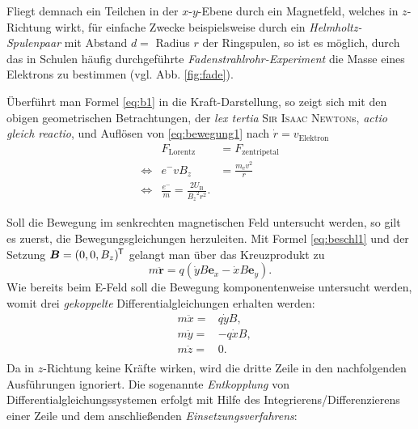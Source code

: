 Fliegt demnach ein Teilchen in der $x$-$y$-Ebene durch ein Magnetfeld, welches in $z$-Richtung wirkt, für einfache Zwecke beispielsweise durch ein \textit{Helmholtz-Spulenpaar} mit Abstand $d =$ Radius $r$ der Ringspulen, so ist es möglich, durch das in Schulen häufig durchgeführte \textit{Fadenstrahlrohr-Experiment} die Masse eines Elektrons zu bestimmen (vgl. Abb. \ref{fig:fade}).\par
Überführt man Formel \eqref{eq:b1} in die Kraft-Darstellung, so zeigt sich mit den obigen geometrischen Betrachtungen, der \textit{lex tertia} \textsc{Sir Isaac Newton}s, \textit{actio gleich reactio}, und Auflösen von  \eqref{eq:bewegung1} nach $\dot{r}=v_\mathrm{Elektron}$
\begin{equation}
\begin{alignedat}{2}
& F_\mathrm{Lorentz}& =F_\mathrm{zentripetal}\\
\Leftrightarrow & e^-vB_z & =\frac{m_\mathrm{e}v^2}{r}\\
\Leftrightarrow & \frac{e^-}{m}=\frac{2U_\mathrm{B}}{{B_z}^2r^2}.
\end{alignedat}
\end{equation} 

Soll die Bewegung im senkrechten magnetischen Feld untersucht werden, so gilt es zuerst, die Bewegungsgleichungen herzuleiten. Mit Formel \eqref{eq:beschl1} und der Setzung $\boldsymbol{B}=(0,0,B_z)^{\mkern-1.5mu\mathsf{T}}$ gelangt man über das Kreuzprodukt zu
\begin{equation}
\label{eq:bfeld1}
m\boldsymbol{\ddot{r}}= q\left(\dot{y}B\boldsymbol{e}_x-\dot{x}B\boldsymbol{e}_y\right).
\end{equation}
Wie bereits beim E-Feld soll die Bewegung komponentenweise untersucht werden, womit drei \textit{gekoppelte} Differentialgleichungen erhalten werden:
\begin{equation}
\label{eq:bfeld2}
\begin{alignedat}{2}
& m\ddot{x}  = & q\dot{y}B, \\
& m\ddot{y}  = & -q\dot{x}B, \\
& m\ddot{z}  = & 0. \\
\end{alignedat}
\end{equation}
Da in $z$-Richtung keine Kräfte wirken, wird die dritte Zeile in den nachfolgenden Ausführungen ignoriert. Die sogenannte \textit{Entkopplung} von Differentialgleichungssystemen erfolgt mit Hilfe des Integrierens/Differenzierens einer Zeile und dem anschließenden \textit{Einsetzungsverfahrens}: 
